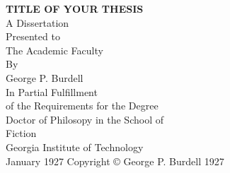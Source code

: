 
\newcommand{\thesisTitle}{TITLE OF YOUR THESIS}  %
\newcommand{\yourName}{George P. Burdell}
\newcommand{\yourSchool}{Fiction}
\newcommand{\yourMonth}{January}
\newcommand{\yourYear}{1927}




\begin{titlepage}
\begin{center}

\begin{singlespacing}

\textbf{\thesisTitle}\\
\vspace{10\baselineskip}
A Dissertation\\
Presented to\\
The Academic Faculty\\
\vspace{3\baselineskip}
By\\
\vspace{3\baselineskip}
\yourName\\
\vspace{3\baselineskip}
In Partial Fulfillment\\
of the Requirements for the Degree\\
Doctor of Philosopy in the School of\\
\yourSchool\\
\vspace{3\baselineskip}
Georgia Institute of Technology\\
\vspace{\baselineskip}
\yourMonth{} \yourYear{}
\vfill
Copyright \copyright{} \yourName{} \yourYear{}

\end{singlespacing}

\end{center}
\end{titlepage}


